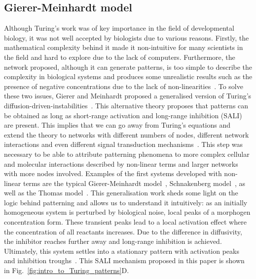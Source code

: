 \subsection{Gierer-Meinhardt model}
Although Turing’s work was of key importance in the field of developmental biology, it was not well accepted by biologists due to various reasons.
Firstly, the mathematical complexity behind it made it non-intuitive for many scientists in the field and hard to explore due to the lack of computers.
Furthermore, the network proposed, although it can generate patterns, is too simple to describe the complexity in biological systems and produces some unrealistic results such as the presence of negative concentrations due to the lack of non-linearities~\parencite{Kondo2010a}.
To solve these two issues, Gierer and Meinhardt proposed a generalised version of Turing’s diffusion-driven-instabilities~\parencite{Gierer1972}.
This alternative theory proposes that patterns can be obtained as long as short-range activation and long-range inhibition (SALI) are present.
This implies that we can go away from Turing’s equations and extend the theory to networks with different numbers of nodes, different network interactions and even different signal transduction mechanisms~\parencite{Murray1983, Rauch2004, Swindale1980}.
This step was necessary to be able to attribute patterning phenomena to more complex cellular and molecular interactions described by non-linear terms and larger networks with more nodes involved.
Examples of the first systems developed with non-linear terms are the typical Gierer-Meinhardt model~\parencite{Gierer1972}, Schnakenberg model~\parencite{Schnakenberg1979}, as well as the Thomas model~\parencite{thomas1976analysis}.
This generalisation work sheds some light on the logic behind patterning and allows us to understand it intuitively: as an initially homogeneous system is perturbed by biological noise, local peaks of a morphogen concentration form.
These transient peaks lead to a local activation effect where the concentration of all reactants increases.
Due to the difference in diffusivity, the inhibitor reaches further away and long-range inhibition is achieved.
Ultimately, this system settles into a stationary pattern with activation peaks and inhibition troughs~\parencite{Gierer1972}.
This SALI mechanism proposed in this paper is shown in Fig.~\ref{fig:intro_to_Turing_patterns}D.
